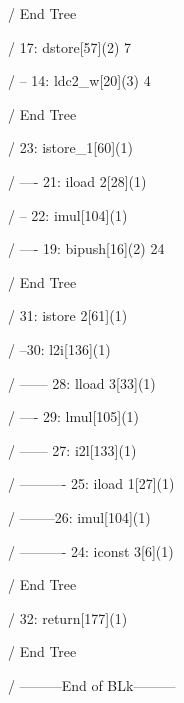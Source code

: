 \begin{listing}
\item /     End Tree
\item /       17: dstore[57](2) 7
\item /            -- 14: ldc2_w[20](3) 4
     
\item /     End Tree
\item /       23: istore_1[60](1)
\item /              ----   21: iload 2[28](1)
\item /            -- 22: imul[104](1)
\item /              ----   19: bipush[16](2) 24

\item /     End Tree
\item /       31: istore 2[61](1)
\item /            --30: l2i[136](1)
\item /               	 ------   28: lload 3[33](1)
\item /              ----   29: lmul[105](1)
\item /                  ------   27: i2l[133](1)
\item /                            ----------    25: iload 1[27](1)
\item /                           --------26: imul[104](1)
\item /                           ----------    24: iconst 3[6](1)
     
\item /     End Tree
\item /       32: return[177](1)
     
\item /     End Tree
\item /     ---------End of BLk---------

\end{listing} 















